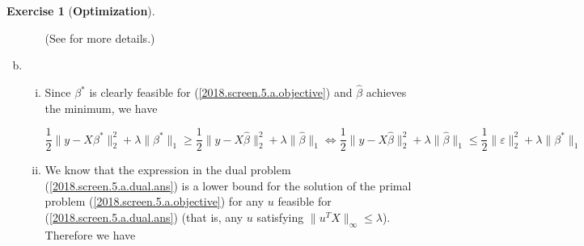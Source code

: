 \documentclass{article}
\theoremstyle{definition}
\newtheorem{exercise}{Exercise}
\theoremstyle{definition}
\theoremstyle{definition}
\theoremstyle{definition}
\theoremstyle{definition}
\renewcommand{\epsilon}{\varepsilon}
\renewcommand{\epsilon}{\varepsilon}
\begin{document}
\begin{exercise}[\textbf{Optimization}]
\begin{enumerate}[(a)]
\begin{enumerate}[(i)]
(See \citet{Osborne2000} for more details.)



%

 


\end{enumerate}

\item 

\begin{enumerate}[(i)]

\item Since \(\beta^*\) is clearly feasible for (\ref{2018.screen.5.a.objective}) and \(\hat{\beta}\) achieves the minimum, we have

\[
\frac{1}{2} \lVert y - X \beta^* \rVert_2^2 + \lambda \lVert \beta^* \rVert_1 \geq \frac{1}{2} \lVert y - X \hat{\beta} \rVert_2^2 + \lambda \lVert \hat{\beta} \rVert_1 \iff  \frac{1}{2} \lVert y - X \hat{\beta} \rVert_2^2 + \lambda \lVert \hat{\beta} \rVert_1 \leq \frac{1}{2} \lVert\epsilon \rVert_2^2 + \lambda \lVert \beta^* \rVert_1
\]


\item


We know that the expression in the dual problem (\ref{2018.screen.5.a.dual.ans}) is a lower bound for the solution of the primal problem (\ref{2018.screen.5.a.objective}) for any \(u\) feasible for (\ref{2018.screen.5.a.dual.ans}) (that is, any \(u\) satisfying \(\lVert u^TX \rVert_\infty \leq \lambda\)). Therefore we have


\end{enumerate}
\end{enumerate}
\end{exercise}
\end{document}
